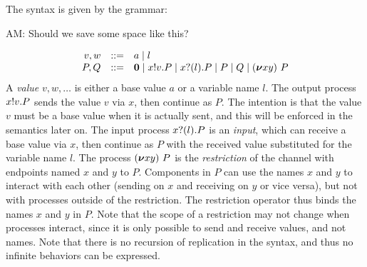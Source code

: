 The syntax is
given by the grammar:
\begin{metanote}
AM:  Should we save some space like this?
\end{metanote}
\[
\begin{array}{rcl}
  v,w & ::= & a \mid l \\
   P,Q & ::=& \bm{0} \mid x ! v . P \mid x ? (l) . P \mid P \mid Q \mid  (\bm{\nu} xy)~P
\end{array}
\]
A \emph{value} \( v, w, \dots \) is either a base value \( a \) or a variable name \( l \).
The output process \( x ! v . P \) sends the value \( v \) via \( x \), then continue as \( P \).
The intention is that the value \( v \) must be a base value when it is actually sent, and this will be enforced in the semantics later on.
The input process \( x ? (l) . P \) is an \emph{input}, which can receive a base value via \( x \), then continue as \( P \) with the received value substituted for the variable name \( l \).
The process \( (\bm{\nu} xy)~P \) is the \emph{restriction} of the channel with endpoints named \( x \) and \( y \) to \( P \).
Components in \( P \) can use the names \( x \) and \( y \) to interact with each other (sending on \( x \) and receiving on \( y \) or vice versa), but not with processes outside of the restriction.
The restriction operator thus binds the names \( x \) and \( y \) in \( P \).
Note that the scope of a restriction may not change when processes interact, since it is only possible to send and receive values, and not names.
Note that there is no recursion of replication in the syntax, and thus no infinite behaviors can be expressed.


